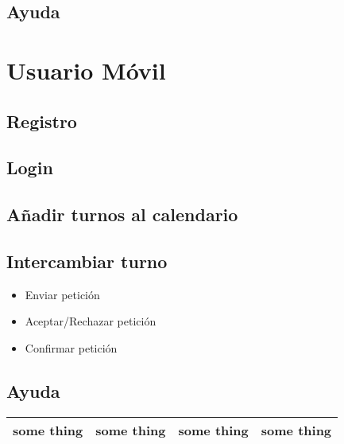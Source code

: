 \subsection{Ayuda}



\section{Usuario Móvil}


\subsection{Registro}

\subsection{Login}

\subsection{Añadir turnos al calendario}

\subsection{Intercambiar turno}

\begin{itemize}

\item Enviar petición

\item Aceptar/Rechazar petición

\item Confirmar petición

\end{itemize}

\subsection{Ayuda}



\begin{tabular}{|c|c|c|c|}
  \hline
   some thing & some thing & some thing & some thing  \\
  \hline
\end{tabular}





